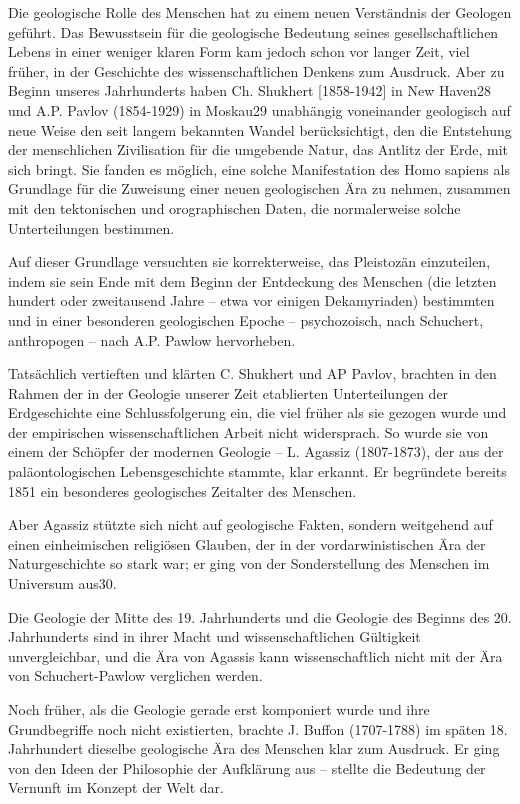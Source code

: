 \documentclass[11pt,a4paper]{book}
\begin{document}
Die geologische Rolle des Menschen hat zu einem neuen Verständnis der Geologen geführt. Das Bewusstsein für die geologische Bedeutung seines gesellschaftlichen Lebens in einer weniger klaren Form kam jedoch schon vor langer Zeit, viel früher, in der Geschichte des wissenschaftlichen Denkens zum Ausdruck. Aber zu Beginn unseres Jahrhunderts haben Ch. Shukhert [1858-1942] in New Haven28 und A.P. Pavlov (1854-1929) in Moskau29 unabhängig voneinander geologisch auf neue Weise den seit langem bekannten Wandel berücksichtigt, den die Entstehung der menschlichen Zivilisation für die umgebende Natur, das Antlitz der Erde, mit sich bringt. Sie fanden es möglich, eine solche Manifestation des Homo sapiens als Grundlage für die Zuweisung einer neuen geologischen Ära zu nehmen, zusammen mit den tektonischen und orographischen Daten, die normalerweise solche Unterteilungen bestimmen. 

Auf dieser Grundlage versuchten sie korrekterweise, das Pleistozän einzuteilen, indem sie sein Ende mit dem Beginn der Entdeckung des Menschen (die letzten hundert oder zweitausend Jahre -- etwa vor einigen Dekamyriaden) bestimmten und in einer besonderen geologischen Epoche -- psychozoisch, nach Schuchert, anthropogen -- nach A.P. Pawlow hervorheben. 

Tatsächlich vertieften und klärten C. Shukhert und AP Pavlov, brachten in den Rahmen der in der Geologie unserer Zeit etablierten Unterteilungen der Erdgeschichte eine Schlussfolgerung ein, die viel früher als sie gezogen wurde und der empirischen wissenschaftlichen Arbeit nicht widersprach. So wurde sie von einem der Schöpfer der modernen Geologie -- L. Agassiz (1807-1873), der aus der paläontologischen Lebensgeschichte stammte, klar erkannt. Er begründete bereits 1851 ein besonderes geologisches Zeitalter des Menschen. 

Aber Agassiz stützte sich nicht auf geologische Fakten, sondern weitgehend auf einen einheimischen religiösen Glauben, der in der vordarwinistischen Ära der Naturgeschichte so stark war; er ging von der Sonderstellung des Menschen im Universum aus30. 

Die Geologie der Mitte des 19. Jahrhunderts und die Geologie des Beginns des 20. Jahrhunderts sind in ihrer Macht und wissenschaftlichen Gültigkeit unvergleichbar, und die Ära von Agassis kann wissenschaftlich nicht mit der Ära von Schuchert-Pawlow verglichen werden. 

Noch früher, als die Geologie gerade erst komponiert wurde und ihre Grundbegriffe noch nicht existierten, brachte J. Buffon (1707-1788) im späten 18. Jahrhundert dieselbe geologische Ära des Menschen klar zum Ausdruck. Er ging von den Ideen der Philosophie der Aufklärung aus -- stellte die Bedeutung der Vernunft im Konzept der Welt dar. 
\end{document}
